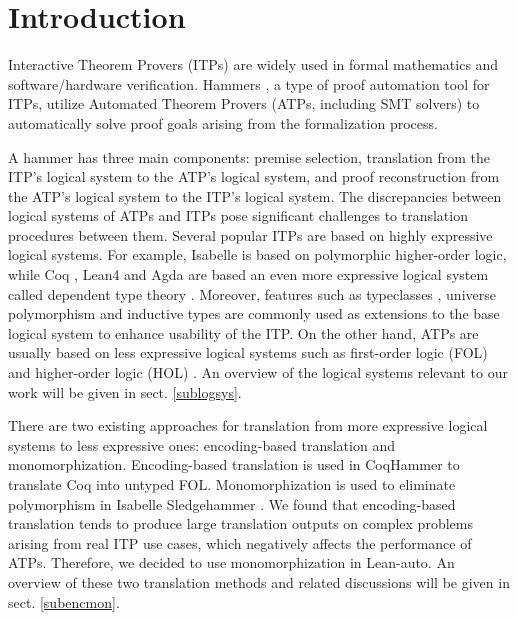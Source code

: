 \section{Introduction}

  Interactive Theorem Provers (ITPs) \cite{Harrison2014HistoryOI}
  are widely used in formal mathematics and software/hardware verification. Hammers
  \cite{Blanchette2016HammeringTQ}\cite{Czajka2018HammerFC}, a type of proof automation tool for
  ITPs, utilize Automated Theorem Provers (ATPs, including SMT solvers) to automatically solve proof goals
  arising from the formalization process.  
  
  A hammer has three main components:
  premise selection, translation from the ITP's logical system to the ATP's
  logical system, and proof reconstruction from the ATP's logical system to
  the ITP's logical system. The discrepancies between logical systems of ATPs and ITPs pose
  significant challenges to translation procedures between them.
  Several popular ITPs are based on highly expressive logical systems.
  For example, Isabelle \cite{Isabelle} is based on polymorphic higher-order logic, while
  Coq \cite{CoqRefMan}, Lean4 \cite{Lean4} and Agda \cite{Agda}
  are based an even more expressive logical system called dependent type theory \cite{LambdaWithType}\cite{Coquand1988}.
  Moreover, features such as typeclasses \cite{TypeClassHaskell}, universe polymorphism \cite{UPolyCoq} and inductive types \cite{CICIndDef}
  are commonly used as extensions to the base logical system to enhance usability of the ITP.
  On the other hand, ATPs are usually based on less expressive logical systems such
  as first-order logic (FOL) \cite{CVC5}\cite{Vampire}\cite{Z3Paper}\cite{EProver} and
  higher-order logic (HOL) \cite{HOVampire}\cite{ZipperpositionMakeWork}\cite{HOEProver}.
  An overview of the logical systems relevant to our work will be given in sect. \ref{sublogsys}.
 
  There are two existing approaches for translation from more expressive
  logical systems to less expressive ones: encoding-based translation and monomorphization.
  Encoding-based translation is used in CoqHammer \cite{Czajka2018HammerFC}
  to translate Coq into untyped FOL. Monomorphization is used to
  eliminate polymorphism in Isabelle Sledgehammer \cite{Blanchette2016HammeringTQ}\cite{Paulson2012ThreeYO}.
  We found that encoding-based translation tends to produce large translation outputs
  on complex problems arising from real ITP use cases, which negatively affects the performance of ATPs.
  Therefore, we decided to use monomorphization in Lean-auto. An overview of these two
  translation methods and related discussions will be given in sect. \ref{subencmon}.

